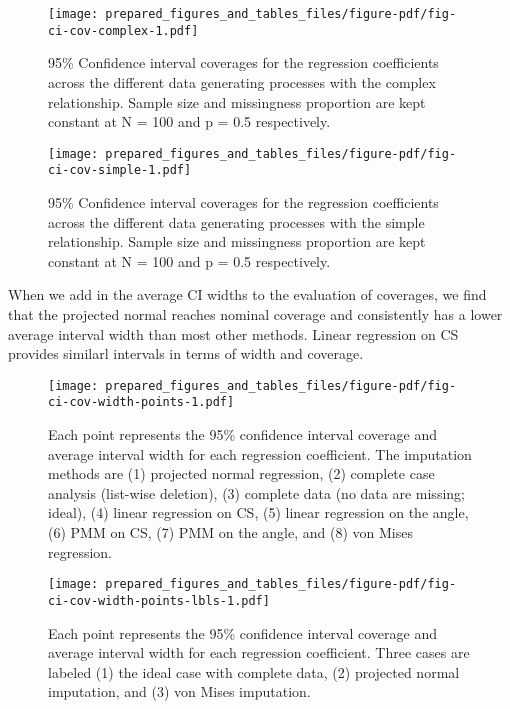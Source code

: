 \documentclass[
]{article}
\begin{document}
\begin{figure}

{\centering \texttt{[image: prepared\_figures\_and\_tables\_files/figure-pdf/fig-ci-cov-complex-1.pdf]}

}

\caption{\label{fig-ci-cov-complex}95\% Confidence interval coverages
for the regression coefficients across the different data generating
processes with the complex relationship. Sample size and missingness
proportion are kept constant at N = 100 and p = 0.5 respectively.}

\end{figure}

\begin{figure}

{\centering \texttt{[image: prepared\_figures\_and\_tables\_files/figure-pdf/fig-ci-cov-simple-1.pdf]}

}

\caption{\label{fig-ci-cov-simple}95\% Confidence interval coverages for
the regression coefficients across the different data generating
processes with the simple relationship. Sample size and missingness
proportion are kept constant at N = 100 and p = 0.5 respectively.}

\end{figure}

When we add in the average CI widths to the evaluation of coverages, we
find that the projected normal reaches nominal coverage and consistently
has a lower average interval width than most other methods. Linear
regression on CS provides similarl intervals in terms of width and
coverage.

\begin{figure}

{\centering \texttt{[image: prepared\_figures\_and\_tables\_files/figure-pdf/fig-ci-cov-width-points-1.pdf]}

}

\caption{\label{fig-ci-cov-width-points}Each point represents the 95\%
confidence interval coverage and average interval width for each
regression coefficient. The imputation methods are (1) projected normal
regression, (2) complete case analysis (list-wise deletion), (3)
complete data (no data are missing; ideal), (4) linear regression on CS,
(5) linear regression on the angle, (6) PMM on CS, (7) PMM on the angle,
and (8) von Mises regression.}

\end{figure}

\begin{figure}

{\centering \texttt{[image: prepared\_figures\_and\_tables\_files/figure-pdf/fig-ci-cov-width-points-lbls-1.pdf]}

}

\caption{\label{fig-ci-cov-width-points-lbls}Each point represents the
95\% confidence interval coverage and average interval width for each
regression coefficient. Three cases are labeled (1) the ideal case with
complete data, (2) projected normal imputation, and (3) von Mises
imputation.}

\end{figure}
\end{document}

